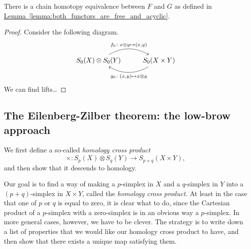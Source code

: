 \documentclass[main.tex]{subfiles}
\begin{document}
\begin{proposition}
  There is a chain homotopy equivalence between $F$ and $G$ as defined in \hyperref[lemma:both_functors_are_free_and_acyclic]{Lemma~\ref*{lemma:both_functors_are_free_and_acyclic}}.
\end{proposition}
\begin{proof}
  Consider the following diagram.
  \begin{equation*}
    \begin{tikzcd}
      S_{0}(X) \otimes S_{0}(Y)
      \arrow[r, bend left, "{f_{0}\colon x \otimes y \mapsto (x, y)}"]
      & S_{0}(X \times Y)
      \arrow[l, bend left, "{g_{0}\colon (x, y) \mapsto x \otimes y}"]
    \end{tikzcd}
  \end{equation*}
  We can find lifts\dots
\end{proof}

\subsection{The Eilenberg-Zilber theorem: the low-brow approach}
\label{ssc:eilenberg_zilber_low_brow}

We first define a so-called \emph{homology cross product}
\begin{equation*}
  \times\colon S_{p}(X) \otimes S_{q}(Y) \to S_{p+q}(X \times Y),
\end{equation*}
and then show that it descends to homology.

Our goal is to find a way of making a $p$-simplex in $X$ and a $q$-simplex in $Y$ into a $(p+q)$-simplex in $X \times Y$, called the \emph{homology cross product.} At least in the case that one of $p$ or $q$ is equal to zero, it is clear what to do, since the Cartesian product of a $p$-simplex with a zero-simplex is in an obvious way a $p$-simplex. In more general cases, however, we have to be clever. The strategy is to write down a list of properties that we would like our homology cross product to have, and then show that there exists a unique map satisfying them.
\end{document}
